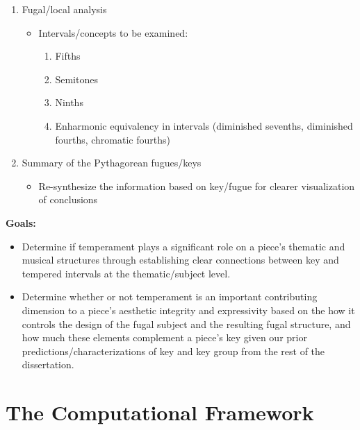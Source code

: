 \begin{enumerate}
\def\labelenumi{\arabic{enumi}.}
\tightlist
\item
  Fugal/local analysis

  \begin{itemize}
  \tightlist
  \item
    Intervals/concepts to be examined:

    \begin{enumerate}
    \def\labelenumii{\arabic{enumii}.}
    \tightlist
    \item
      Fifths
    \item
      Semitones
    \item
      Ninths
    \item
      Enharmonic equivalency in intervals (diminished sevenths,
      diminished fourths, chromatic fourths)
    \end{enumerate}
  \end{itemize}
\item
  Summary of the Pythagorean fugues/keys

  \begin{itemize}
  \tightlist
  \item
    Re-synthesize the information based on key/fugue for clearer
    visualization of conclusions
  \end{itemize}
\end{enumerate}

\textbf{Goals:}

\begin{itemize}
\tightlist
\item
  Determine if temperament plays a significant role on a piece's
  thematic and musical structures through establishing clear connections
  between key and tempered intervals at the thematic/subject level.
\item
  Determine whether or not temperament is an important contributing
  dimension to a piece's aesthetic integrity and expressivity based on
  the how it controls the design of the fugal subject and the resulting
  fugal structure, and how much these elements complement a piece's key
  given our prior predictions/characterizations of key and key group
  from the rest of the dissertation.
\end{itemize}

    \section{The Computational Framework}\label{the-computational-framework}

